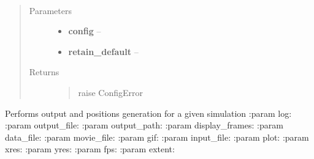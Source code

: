 \documentclass[letterpaper,10pt,english]{sphinxmanual}
\begin{document}
\begin{fulllineitems}
\begin{fulllineitems}
\end{fulllineitems}


\begin{fulllineitems}
\label{index:aietes.Simulation.populate_config}~\begin{quote}\begin{description}
\item[{Parameters}] \leavevmode\begin{itemize}
\item {} 
\textbf{config} -- 

\item {} 
\textbf{retain\_default} -- 

\end{itemize}

\item[{Returns}] \leavevmode
\begin{quote}\begin{description}
\item[{raise ConfigError}] \leavevmode
\end{description}\end{quote}


\end{description}\end{quote}

\end{fulllineitems}


\begin{fulllineitems}
\label{index:aietes.Simulation.postprocess}
Performs output and positions generation for a given simulation
:param log:
:param output\_file:
:param output\_path:
:param display\_frames:
:param data\_file:
:param movie\_file:
:param gif:
:param input\_file:
:param plot:
:param xres:
:param yres:
:param fps:
:param extent:

\end{fulllineitems}


\end{fulllineitems}
\end{document}

